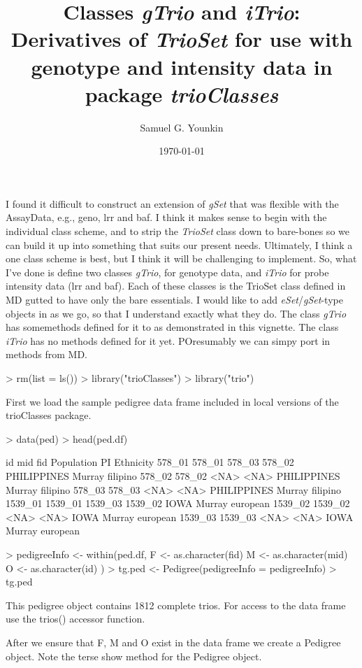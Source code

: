\documentclass[10pt]{article}
\title{Classes \emph{gTrio} and \emph{iTrio}: Derivatives of \emph{TrioSet} for use with genotype and intensity data in package \emph{trioClasses}}
\author{Samuel G. Younkin}
\date{\today}
\begin{document}
\setlength{\parskip}{0.2\baselineskip}
\setlength{\parindent}{0pt}
\maketitle
I found it difficult to construct an extension of \emph{gSet} that was flexible with the AssayData, e.g., geno, lrr and baf.  I think it makes sense to begin with the individual class scheme, and to strip the \emph{TrioSet} class down to bare-bones so we can build it up into something that suits our present needs.  Ultimately, I think a one class scheme is best, but I think it will be challenging to implement.  So, what I've done is define two classes \emph{gTrio}, for genotype data, and \emph{iTrio} for probe intensity data (lrr and baf).  Each of these classes is the TrioSet class defined in MD gutted to have only the bare essentials.  I would like to add  \emph{eSet}/\emph{gSet}-type objects in as we go, so that I understand exactly what they do.  The class \emph{gTrio} has somemethods defined for it to as demonstrated in this vignette.  The class \emph{iTrio} has no methods defined for it yet.  POresumably we can simpy port in methods from MD.
\begin{Schunk}
\begin{Sinput}
> rm(list = ls())
> library("trioClasses")
> library("trio")
\end{Sinput}
\end{Schunk}
First we load the sample pedigree data frame included in local versions of the trioClasses package.
\begin{Schunk}
\begin{Sinput}
> data(ped)
> head(ped.df)
\end{Sinput}
\begin{Soutput}
             id     mid     fid  Population     PI Ethnicity
578_01   578_01  578_03  578_02 PHILIPPINES Murray  filipino
578_02   578_02    <NA>    <NA> PHILIPPINES Murray  filipino
578_03   578_03    <NA>    <NA> PHILIPPINES Murray  filipino
1539_01 1539_01 1539_03 1539_02        IOWA Murray  european
1539_02 1539_02    <NA>    <NA>        IOWA Murray  european
1539_03 1539_03    <NA>    <NA>        IOWA Murray  european
\end{Soutput}
\begin{Sinput}
> pedigreeInfo <- within(ped.df, {
     F <- as.character(fid)
     M <- as.character(mid)
     O <- as.character(id)
 })
> tg.ped <- Pedigree(pedigreeInfo = pedigreeInfo)
> tg.ped
\end{Sinput}
\begin{Soutput}
This pedigree object contains 1812 complete trios.
For access to the data frame use the trios() accessor function.
\end{Soutput}
\end{Schunk}
After we ensure that F, M and O exist in the data frame we create a Pedigree object.  Note the terse show method for the Pedigree object.
\end{document}

